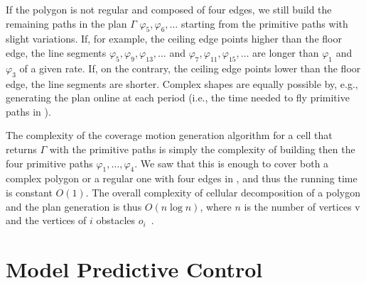 If the polygon is not regular and composed of four edges, we still build the remaining paths in the plan $\Gamma$ $\varphi_5,\varphi_6,\dots$ starting from the primitive paths with slight variations. If, for example, the ceiling edge points higher than the floor edge, the line segments $\varphi_5,\varphi_9,\varphi_{13},\dots$ and $\varphi_7,\varphi_{11},\varphi_{15},\dots$ are longer than $\varphi_{1}$ and $\varphi_3$ of a given rate. If, on the contrary, the ceiling edge points lower than the floor edge, the line segments are shorter. Complex shapes are equally possible by, e.g., generating the plan online at each period (i.e., the time needed to fly primitive paths in ). 

The complexity of the coverage motion generation algorithm for a cell that returns $\Gamma$ with the primitive paths is simply the complexity of building then the four primitive paths $\varphi_1,\dots,\varphi_4$. We saw that this is enough to cover both a complex polygon or a regular one with four edges in , and thus the running time is constant $O(1)$. The overall complexity of cellular decomposition of a polygon and the plan generation is thus $O(n\log{n})$, where $n$ is the number of vertices v and the vertices of $i$ obstacles $o_i$~\citep{choset2000exact}.




%


\section{Model Predictive Control}

